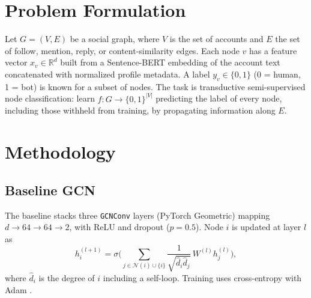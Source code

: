 \documentclass[conference]{IEEEtran}
\begin{document}
\section{Problem Formulation}

Let $G=(V,E)$ be a social graph, where $V$ is the set of accounts and $E$ the set of follow, mention, reply, or content-similarity edges. Each node $v$ has a feature vector $x_v\in\mathbb{R}^d$ built from a Sentence-BERT embedding of the account text concatenated with normalized profile metadata. A label $y_v\in\{0,1\}$ (0 = human, 1 = bot) is known for a subset of nodes. The task is transductive semi-supervised node classification: learn $f: G\rightarrow\{0,1\}^{|V|}$ predicting the label of every node, including those withheld from training, by propagating information along $E$.

\section{Methodology}

\subsection{Baseline GCN}
The baseline stacks three \texttt{GCNConv} layers (PyTorch Geometric) mapping $d\rightarrow64\rightarrow64\rightarrow2$, with ReLU and dropout ($p=0.5$). Node $i$ is updated at layer $l$ as
\begin{equation}
h_i^{(l+1)}=\sigma\Big(\sum_{j\in\mathcal{N}(i)\cup\{i\}}\frac{1}{\sqrt{\hat d_i\hat d_j}}\,W^{(l)}h_j^{(l)}\Big),
\label{eq:gcn}
\end{equation}
where $\hat d_i$ is the degree of $i$ including a self-loop. Training uses cross-entropy with Adam \cite{kingma2015adam}.
\end{document}
